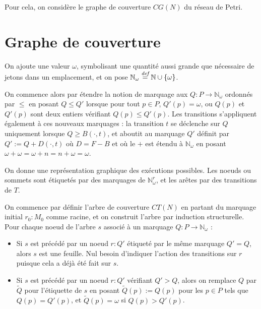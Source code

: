 \documentclass[a4paper,final]{article}
\let\leq\leqslant
\let\geq\geqslant
\newcommand{\os}[1]{\left\{\mathinner{#1}\right\}}
\newcommand{\defeq}{\ensuremath{\stackrel{\textit{def}}{=}}}
\let\union\cup
\newcommand{\N}{\ensuremath{\mathbb{N}}}
\newcommand{\petri}{réseau de Petri\xspace}
\begin{document}
Pour cela, on considère le graphe de couverture $CG(N)$ du \petri.


\section{Graphe de couverture}

On ajoute une valeur $\omega$, symbolisant une quantité aussi grande que nécessaire de jetons dans un emplacement, et on pose $\N_\omega\defeq \N\union\os{\omega}$.

On commence alors par étendre la notion de marquage aux $Q:P\to\N_\omega$ ordonnés par $\leq$ en posant $Q\leq Q'$ lorsque pour tout $p\in P$, $Q'(p)=\omega$, ou $Q(p)$ et $Q'(p)$ sont deux entiers vérifiant $Q(p)\leq Q'(p)$.
Les transitions s'appliquent également à ces nouveaux marquages :
la transition $t$ se déclenche sur $Q$ uniquement lorsque $Q\geq B(\cdot,t)$, et aboutit au marquage $Q'$ définit par $Q':=Q+D(\cdot,t)$ où $D=F-B$ et où le $+$ est étendu à $\N_\omega$ en posant $\omega+\omega=\omega+n=n+\omega=\omega$.

On donne une représentation graphique des exécutions possibles.
Les noeuds ou sommets sont étiquetés par des marquages de $\N_\omega^r$, et les arêtes par des transitions de $T$.

On commence par définir l'arbre de couverture $CT(N)$ en partant du marquage initial $r_0:M_0$ comme racine, et on construit l'arbre par induction structurelle.
Pour chaque noeud de l'arbre $s$ associé à un marquage $Q:P\to\N_\omega$ :
\begin{itemize}
    \item Si $s$ est précédé par un noeud $r:Q'$ étiqueté par le même marquage $Q'=Q$, alors $s$ est une feuille.
    Nul besoin d'indiquer l'action des transitions sur $r$ puisque cela a déjà été fait sur $s$.
    \item Si $s$ est précédé par un noeud $r:Q'$ vérifiant $Q'>Q$, alors on remplace $Q$ par $\tilde{Q}$ pour l'étiquette de $s$ en posant $\tilde{Q}(p):=Q(p)$ pour les $p\in P$ tels que $Q(p)=Q'(p)$, et $\tilde{Q}(p)=\omega$ si $Q(p)>Q'(p)$.
\end{itemize}

\end{document}
